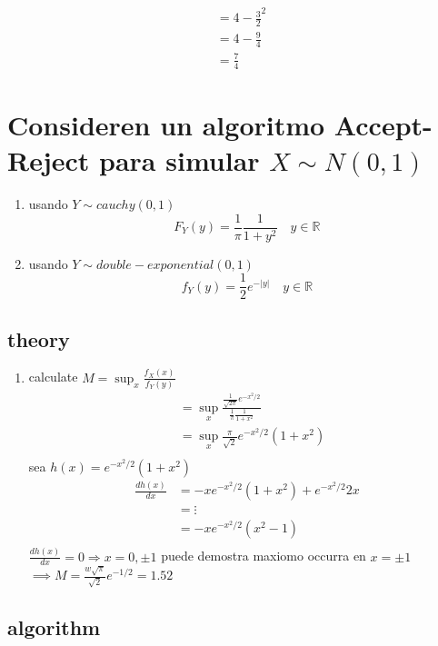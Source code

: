 \documentclass[10pt, oneside]{article}
\newcommand{\R}{\mathbb{R}}
\begin{document}
\[
	\begin{split}
		& = 4- \frac{3}{2}^2 \\
		& = 4 - \frac{9}{4}  \\
		& = \frac{7}{4}
	\end{split}
\]

\section{Consideren un algoritmo Accept-Reject para simular $X \sim N(0,1)$}

\begin{enumerate}
	\item usando $Y \sim cauchy(0,1)$
	      $$
		      F_Y(y) = \frac{1}{\pi} \frac{1}{1+y^2} \quad y \in \R
	      $$
	\item usando $Y \sim double-exponential(0,1)$
	      $$
		      f_Y(y) = \frac{1}{2} e^{-|y|} \quad y \in \R
	      $$
\end{enumerate}

\subsection{theory}
\begin{enumerate}
	\item calculate $M = \sup_x \frac{f_X(x)}{f_Y(y)}$
	      \[
		      \begin{split}
			      & = \sup_x \frac{\frac{1}{\sqrt{2\pi}} e^{-x^2/2}}{\frac{1}{\pi} \frac{1}{1+x^2}} \\
			      & = \sup_x \frac{\pi}{\sqrt{2}} e^{-x^2/2} (1+x^2)                                \\
		      \end{split}
	      \]
	      sea $h(x) = e^{-x^2/2} (1+x^2)$
	      \[
		      \begin{split}
			      \frac{d h(x)}{dx} & = -x e^{-x^2/2}(1+x^2) + e^{-x^2/2} 2x \\
			      & = \vdots                               \\
			      & = -x e^{-x^2/2}(x^2-1)                 \\
		      \end{split}
	      \]
	      $\frac{d h(x)}{dx} = 0 \Rightarrow x = 0, \pm 1$
	      puede demostra maxiomo occurra en $x = \pm 1$
	      $\implies M = \frac{w \sqrt{\pi}}{\sqrt{2}} e^{-1/2} = 1.52$
\end{enumerate}

\subsection{algorithm}
\end{document}
